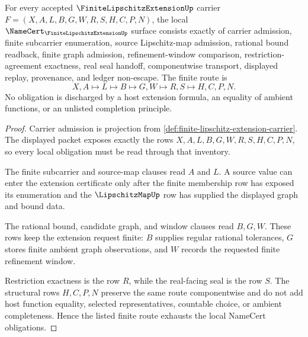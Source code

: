 \begin{theorem}
\label{thm:finite-lipschitz-extension-namecert-obligations}
For every accepted $\FiniteLipschitzExtensionUp$ carrier $F=(X,A,L,B,G,W,R,S,H,C,P,N)$, the local $\NameCert_{\FiniteLipschitzExtensionUp}$ surface consists exactly of carrier admission, finite subcarrier enumeration, source Lipschitz-map admission, rational bound readback, finite graph admission, refinement-window comparison, restriction-agreement exactness, real seal handoff, componentwise transport, displayed replay, provenance, and ledger non-escape. The finite route is
$$
X,A \longmapsto L \longmapsto B \longmapsto G,W \longmapsto R,S \longmapsto H,C,P,N .
$$
No obligation is discharged by a host extension formula, an equality of ambient functions, or an unlisted completion principle.
\end{theorem}
\begin{proof}
Carrier admission is projection from \autoref{def:finite-lipschitz-extension-carrier}. The displayed packet exposes exactly the rows $X,A,L,B,G,W,R,S,H,C,P,N$, so every local obligation must be read through that inventory.

The finite subcarrier and source-map clauses read $A$ and $L$. A source value can enter the extension certificate only after the finite membership row has exposed its enumeration and the $\LipschitzMapUp$ row has supplied the displayed graph and bound data.

The rational bound, candidate graph, and window clauses read $B,G,W$. These rows keep the extension request finite: $B$ supplies regular rational tolerances, $G$ stores finite ambient graph observations, and $W$ records the requested finite refinement window.

Restriction exactness is the row $R$, while the real-facing seal is the row $S$. The structural rows $H,C,P,N$ preserve the same route componentwise and do not add host function equality, selected representatives, countable choice, or ambient completeness. Hence the listed finite route exhausts the local NameCert obligations.
\end{proof}

